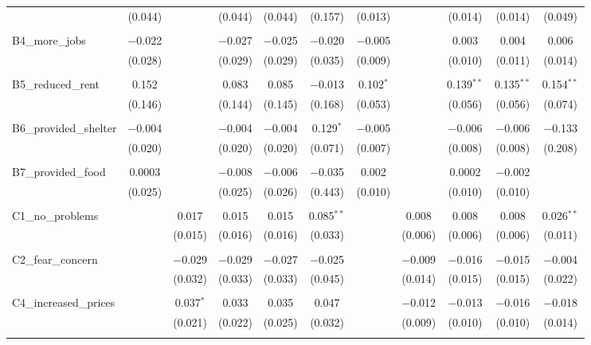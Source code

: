 \begin{table}[H]
\begin{tabular}{@{\extracolsep{4pt}}lcccccccccc}
  & (0.044) &  & (0.044) & (0.044) & (0.157) & (0.013) &  & (0.014) & (0.014) & (0.049) \\ 
  & & & & & & & & & & \\ 
 B4\_more\_jobs & $-$0.022 &  & $-$0.027 & $-$0.025 & $-$0.020 & $-$0.005 &  & 0.003 & 0.004 & 0.006 \\ 
  & (0.028) &  & (0.029) & (0.029) & (0.035) & (0.009) &  & (0.010) & (0.011) & (0.014) \\ 
  & & & & & & & & & & \\ 
 B5\_reduced\_rent & 0.152 &  & 0.083 & 0.085 & $-$0.013 & 0.102$^{*}$ &  & 0.139$^{**}$ & 0.135$^{**}$ & 0.154$^{**}$ \\ 
  & (0.146) &  & (0.144) & (0.145) & (0.168) & (0.053) &  & (0.056) & (0.056) & (0.074) \\ 
  & & & & & & & & & & \\ 
 B6\_provided\_shelter & $-$0.004 &  & $-$0.004 & $-$0.004 & 0.129$^{*}$ & $-$0.005 &  & $-$0.006 & $-$0.006 & $-$0.133 \\ 
  & (0.020) &  & (0.020) & (0.020) & (0.071) & (0.007) &  & (0.008) & (0.008) & (0.208) \\ 
  & & & & & & & & & & \\ 
 B7\_provided\_food & 0.0003 &  & $-$0.008 & $-$0.006 & $-$0.035 & 0.002 &  & 0.0002 & $-$0.002 &  \\ 
  & (0.025) &  & (0.025) & (0.026) & (0.443) & (0.010) &  & (0.010) & (0.010) &  \\ 
  & & & & & & & & & & \\ 
 C1\_no\_problems &  & 0.017 & 0.015 & 0.015 & 0.085$^{**}$ &  & 0.008 & 0.008 & 0.008 & 0.026$^{**}$ \\ 
  &  & (0.015) & (0.016) & (0.016) & (0.033) &  & (0.006) & (0.006) & (0.006) & (0.011) \\ 
  & & & & & & & & & & \\ 
 C2\_fear\_concern &  & $-$0.029 & $-$0.029 & $-$0.027 & $-$0.025 &  & $-$0.009 & $-$0.016 & $-$0.015 & $-$0.004 \\ 
  &  & (0.032) & (0.033) & (0.033) & (0.045) &  & (0.014) & (0.015) & (0.015) & (0.022) \\ 
  & & & & & & & & & & \\ 
 C4\_increased\_prices &  & 0.037$^{*}$ & 0.033 & 0.035 & 0.047 &  & $-$0.012 & $-$0.013 & $-$0.016 & $-$0.018 \\ 
  &  & (0.021) & (0.022) & (0.025) & (0.032) &  & (0.009) & (0.010) & (0.010) & (0.014) \\ 
  & & & & & & & & & & \\ 

\end{tabular}
\end{table}
